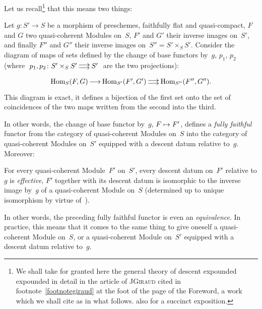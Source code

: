 Let us recall\footnote{We shall take for granted here the
general theory of descent expounded expounded in detail
in the article of J\ptbl \textsc{Giraud} cited in
footnote~\eqref{footnotegiraud} at the foot of the page of the Foreword, a work
which we shall cite as \cite{VIII.D} in what follows. \Cf also \cite{VIII.2} for a
succinct exposition.} that this means two things:

\begin{corollary}
\label{VIII.1.2}
Let $g\colon S'\to S$ be a morphism of preschemes,
faithfully flat and quasi-compact, $F$ and $G$ two
quasi-coherent Modules on~$S$, $F'$ and $G'$ their inverse images
on~$S'$, and finally $F''$ and $G''$ their inverse images
on~$S''=S'\times_{S}S'$. Consider the diagram of maps
of sets defined by the change of base functors by~$g$,
$p_{1}$, $p_{2}$ (where $\xymatrix@C=.5cm{p_{1},p_{2}\colon
S'\times_{S}S'\ar@<2pt>[r]\ar@<-2pt>[r] & S'}$ are the two
projections):
$$
\xymatrix@C=.5cm{\Hom_{S}(F,G)\ar[r] &
\Hom_{S'}(F',G')\ar@<2pt>[r]\ar@<-2pt>[r] & \Hom_{S''}(F'',G'').}
$$
This diagram is exact, \ie it defines a bijection of the first
set onto the set of coincidences of the two maps
written from the second into the third.
\end{corollary}

In other words, the change of base functor
by~$g$,
$F\mto F'$, defines a \emph{fully
faithful} functor from the category of quasi-coherent Modules on~$S$ into the category of quasi-coherent Modules on~$S'$
equipped with a descent datum relative
to~$g$.
Moreover:

\begin{corollary}
\label{VIII.1.3}
For every quasi-coherent Module~$F'$ on~$S'$, every descent
datum on~$F'$ relative to $g$ is \emph{effective},
\ie $F'$ together with its descent datum is isomorphic to the inverse
image by~$g$ of a quasi-coherent Module on~$S$
(determined up to unique isomorphism by virtue
of~).
\end{corollary}

In other words, the preceding fully faithful functor
is even an
\emph{equivalence}. In practice, this means that it comes to the
same thing to give oneself a quasi-coherent Module on~$S$, or a
quasi-coherent Module on~$S'$ equipped with a descent datum
relative to~$g$.

